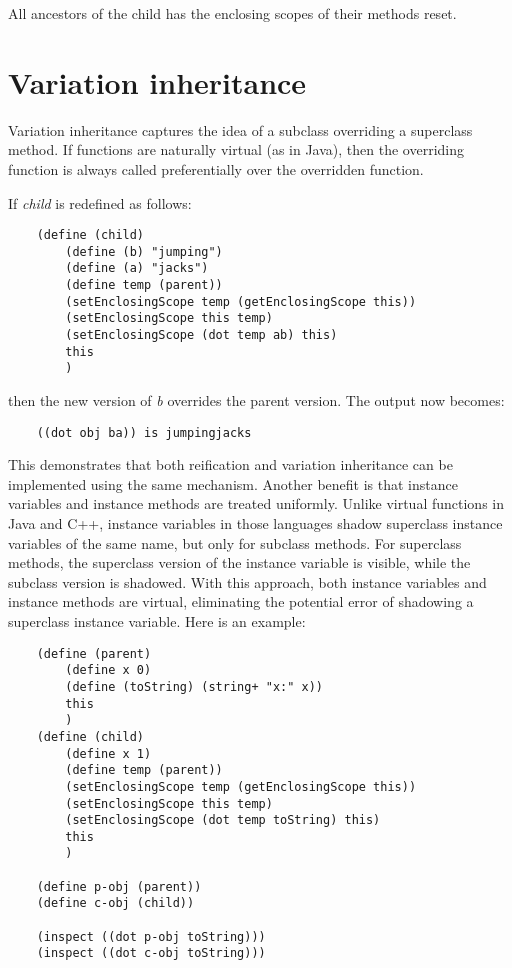 All ancestors of the child has the enclosing scopes of their methods reset.

\section{Variation inheritance}

Variation inheritance captures the idea of a subclass overriding a
superclass method. If functions are naturally virtual (as in Java),
then the overriding function is always called preferentially over the
overridden function.

If {\it child} is redefined as follows:

\begin{verbatim}
    (define (child)
        (define (b) "jumping")
        (define (a) "jacks")
        (define temp (parent))
        (setEnclosingScope temp (getEnclosingScope this))
        (setEnclosingScope this temp)
        (setEnclosingScope (dot temp ab) this)
        this
        )
\end{verbatim}

then the new version of {\it b} overrides the parent version.  The output
now becomes:

\begin{verbatim}
    ((dot obj ba)) is jumpingjacks 
\end{verbatim}

This demonstrates that both reification and variation inheritance can be
implemented using the same mechanism.  Another benefit is that instance
variables and instance methods are treated uniformly. Unlike virtual
functions in Java and C++, instance variables in those languages shadow
superclass instance variables of the same name, but only for subclass
methods.  For superclass methods, the superclass version of the instance
variable is visible, while the subclass version is shadowed.  With this
approach, both instance variables and instance methods are virtual,
eliminating the potential error of shadowing a superclass instance
variable. Here is an example:

\begin{verbatim}
    (define (parent)
        (define x 0)
        (define (toString) (string+ "x:" x))
        this
        )
    (define (child)
        (define x 1)
        (define temp (parent))
        (setEnclosingScope temp (getEnclosingScope this))
        (setEnclosingScope this temp)
        (setEnclosingScope (dot temp toString) this)
        this
        )

    (define p-obj (parent))
    (define c-obj (child))

    (inspect ((dot p-obj toString)))
    (inspect ((dot c-obj toString)))
\end{verbatim}


